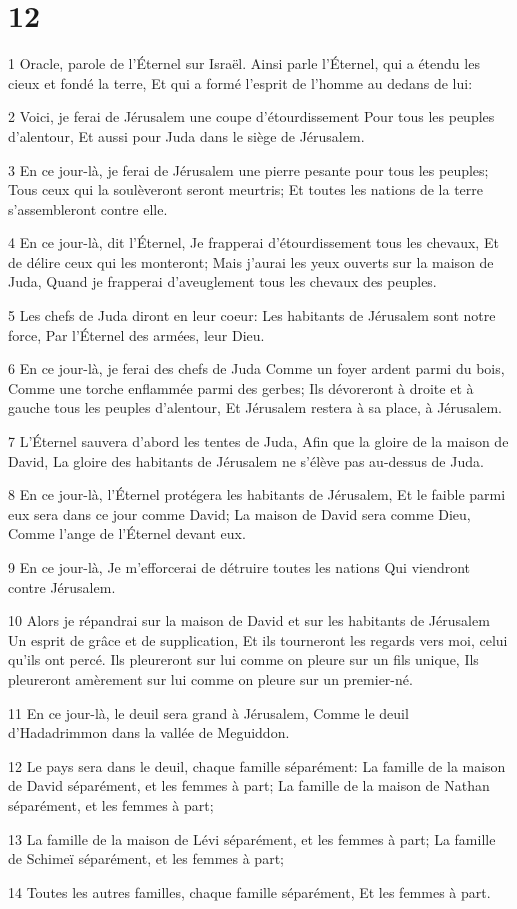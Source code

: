 \chapter{12}

\par 1 Oracle, parole de l'Éternel sur Israël. Ainsi parle l'Éternel, qui a étendu les cieux et fondé la terre, Et qui a formé l'esprit de l'homme au dedans de lui:
\par 2 Voici, je ferai de Jérusalem une coupe d'étourdissement Pour tous les peuples d'alentour, Et aussi pour Juda dans le siège de Jérusalem.
\par 3 En ce jour-là, je ferai de Jérusalem une pierre pesante pour tous les peuples; Tous ceux qui la soulèveront seront meurtris; Et toutes les nations de la terre s'assembleront contre elle.
\par 4 En ce jour-là, dit l'Éternel, Je frapperai d'étourdissement tous les chevaux, Et de délire ceux qui les monteront; Mais j'aurai les yeux ouverts sur la maison de Juda, Quand je frapperai d'aveuglement tous les chevaux des peuples.
\par 5 Les chefs de Juda diront en leur coeur: Les habitants de Jérusalem sont notre force, Par l'Éternel des armées, leur Dieu.
\par 6 En ce jour-là, je ferai des chefs de Juda Comme un foyer ardent parmi du bois, Comme une torche enflammée parmi des gerbes; Ils dévoreront à droite et à gauche tous les peuples d'alentour, Et Jérusalem restera à sa place, à Jérusalem.
\par 7 L'Éternel sauvera d'abord les tentes de Juda, Afin que la gloire de la maison de David, La gloire des habitants de Jérusalem ne s'élève pas au-dessus de Juda.
\par 8 En ce jour-là, l'Éternel protégera les habitants de Jérusalem, Et le faible parmi eux sera dans ce jour comme David; La maison de David sera comme Dieu, Comme l'ange de l'Éternel devant eux.
\par 9 En ce jour-là, Je m'efforcerai de détruire toutes les nations Qui viendront contre Jérusalem.
\par 10 Alors je répandrai sur la maison de David et sur les habitants de Jérusalem Un esprit de grâce et de supplication, Et ils tourneront les regards vers moi, celui qu'ils ont percé. Ils pleureront sur lui comme on pleure sur un fils unique, Ils pleureront amèrement sur lui comme on pleure sur un premier-né.
\par 11 En ce jour-là, le deuil sera grand à Jérusalem, Comme le deuil d'Hadadrimmon dans la vallée de Meguiddon.
\par 12 Le pays sera dans le deuil, chaque famille séparément: La famille de la maison de David séparément, et les femmes à part; La famille de la maison de Nathan séparément, et les femmes à part;
\par 13 La famille de la maison de Lévi séparément, et les femmes à part; La famille de Schimeï séparément, et les femmes à part;
\par 14 Toutes les autres familles, chaque famille séparément, Et les femmes à part.

